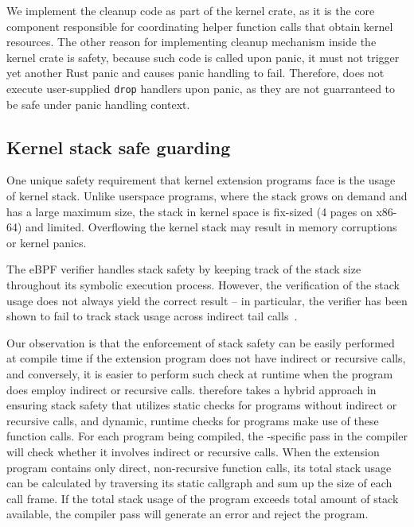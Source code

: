 
We implement the cleanup code as part of the \projname{} kernel crate, as it
    is the core component responsible for coordinating helper function calls
    that obtain kernel resources.
The other reason for implementing cleanup mechanism inside the kernel crate is
    safety, because such code is called upon panic, it must not trigger yet
    another Rust panic and causes panic handling to fail.
Therefore, \projname{} does not execute user-supplied \texttt{drop} handlers
    upon panic, as they are not guarranteed to be safe under panic handling
    context.

\subsection{Kernel stack safe guarding}
\label{principle:stack}
One unique safety requirement that kernel extension programs face is the
    usage of kernel stack.
Unlike userspace programs, where the stack grows on demand and has a large
    maximum size,
    the stack in kernel space is fix-sized (4 pages on x86-64) and limited.
Overflowing the kernel stack may result in memory corruptions or kernel panics.

The eBPF verifier handles stack safety by keeping track of the stack size
    throughout its symbolic execution process.
However, the verification of the stack usage does not always yield the correct
    result -- in particular, the verifier has been shown to fail to track stack
    usage across indirect tail calls~\cite{ebpf-stackoverflow}.

Our observation is that the enforcement of stack safety can be easily performed
    at compile time if the extension program does not have indirect or
    recursive calls, and conversely, it is easier to perform such check at
    runtime when the program does employ indirect or recursive calls.
\projname{} therefore takes a hybrid approach in ensuring stack safety that
    utilizes static checks for programs without indirect or recursive calls,
    and dynamic, runtime checks for programs make use of these function calls.
For each program being compiled, the \projname{}-specific pass in the compiler
    will check whether it involves indirect or recursive calls.
When the extension program contains only direct, non-recursive function calls,
    its total stack usage can be calculated by traversing its static callgraph
    and sum up the size of each call frame.
If the total stack usage of the program exceeds total amount of stack
    available, the \projname{} compiler pass will generate an error and reject
    the program.

